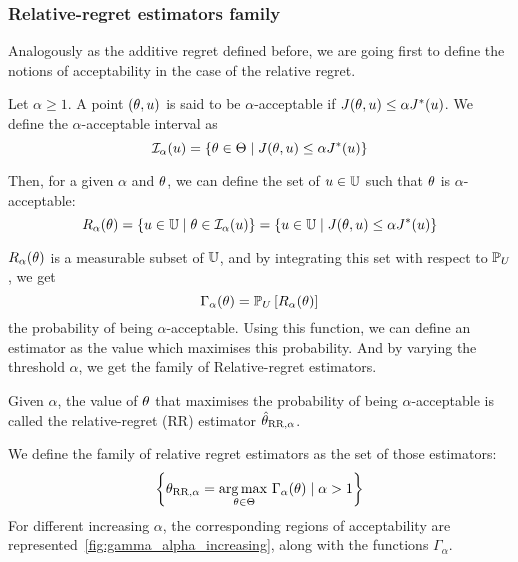 \documentclass[../../Main_ManuscritThese.tex]{subfiles}
\begin{document}
\subsubsection{Relative-regret estimators family}
Analogously as the additive regret defined before, we are going first
to define the notions of acceptability in the case of the relative
regret.
\begin{definition}
  Let $\alpha\geq 1$.  A point $(\theta, u)$ is said to be
  $\alpha$-acceptable if $J(\theta, u) \leq \alpha J^*(u)$.  We
  define the $\alpha$-acceptable interval as
  \begin{equation}
    \mathcal{I}_{\alpha}(u) = \left\{\theta \in \Theta \mid J(\theta,u) \leq \alpha J^*(u) \right\}
  \end{equation}

  Then, for a given $\alpha$ and $\theta$, we can define the set of
  $u\in \mathbb{U}$ such that $\theta$ is $\alpha$-acceptable:
\begin{equation}
  R_{\alpha}(\theta) = \left\{u \in \mathbb{U} \mid \theta \in \mathcal{I}_{\alpha}(u) \right\} = \left\{u \in \mathbb{U} \mid  J(\theta, u) \leq \alpha J^*(u) \right\}
\end{equation}
\end{definition}
$R_{\alpha}(\theta)$ is a measurable subset of $\mathbb{U}$, and by integrating this set with respect to $\mathbb{P}_U$, we get
\begin{equation}
\Gamma_{\alpha}(\theta) = \mathbb{P}_{U}\left[R_\alpha(\theta)\right]
\end{equation}
the probability of being $\alpha$-acceptable. Using this function, we
can define an estimator as the value which maximises this
probability. And by varying the threshold $\alpha$, we get the family
of Relative-regret estimators.


\begin{definition}
  \label{def:RR_family}
  Given $\alpha$, the value of $\theta$ that maximises the probability of
  being $\alpha$-acceptable is called the relative-regret (RR)
  estimator $\hat{\theta}_{\mathrm{RR},\alpha}$.
  
  We define the family of relative regret estimators as the set of
  those estimators:
\begin{equation}
  \label{eq:def_RR_family}
    \left\{{\theta}_{\mathrm{RR,\alpha}} = \operatorname*{arg\,max \,}_{\theta\in\Theta} \Gamma_{\alpha}(\theta)\mid \alpha > 1\right\}
    \end{equation}
    For different increasing $\alpha$, the corresponding regions of
    acceptability are represented~\cref{fig:gamma_alpha_increasing},
    along with the functions $\Gamma_{\alpha}$.
  \end{definition}
\end{document}
